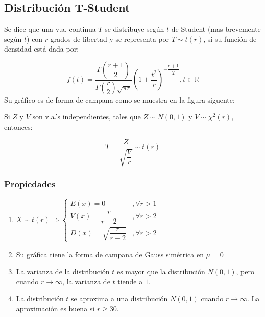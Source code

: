 \subsection{Distribución T-Student}
Se dice que una v.a. continua $T$ se distribuye según $t$ de Student (mas brevemente según $t$) con $r$ grados de libertad y se representa por $T\sim t(r)$, si su función de densidad está dada por:

$$
f(t)=\dfrac{\Gamma\left( \dfrac{r+1}{2}\right)}{\Gamma\left(\dfrac{r}{2}\right)\sqrt{\pi r}}\left(1+ \dfrac{t^2}{r}\right)^{-\dfrac{r+1}{2}}, t\in \mathbb{R}
$$
Su gráfico es de forma de campana como se muestra en la figura siguente:

\begin{center}
\end{center}

Si $Z$ y $V$ son v.a.'s independientes, tales que $Z\sim N(0,1)$ y $V\sim\chi^2(r)$, entonces:

$$ T =  \dfrac{Z}{\sqrt{\dfrac{V}{r}}}\sim t(r)$$

\subsubsection{Propiedades}

\begin{enumerate}
\item $X \sim t(r) \Rightarrow
\begin{cases}
E(x)=0&,\forall r>1 \\
V(x)=\dfrac{r}{r-2}&,\forall r>2 \\
D(x) = \sqrt{\dfrac{r}{r-2}}&,\forall r>2
\end{cases}
$
\item Su gráfica tiene la forma de campana de Gauss simétrica en $\mu = 0$
\item La varianza de la distribución $t$ es mayor que la distribución $N(0,1)$, pero cuando $r\rightarrow\infty$, la varianza de $t$ tiende a $1$.
\item La distribución $t$ se aproxima a una distribución $N(0,1)$ cuando $r\rightarrow\infty$. La aproximación es buena si $r\geq 30$.
\end{enumerate}

